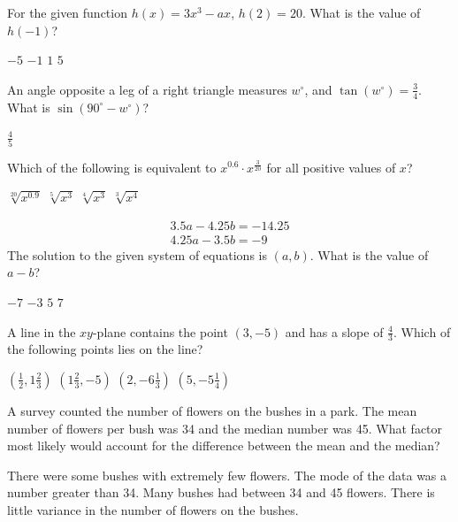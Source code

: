 \question[1]
For the given function $h(x) = 3x^3 - a x$, $h(2) = 20$. What is the value of $h(-1)$?
\begin{choices}
  \choice $-5$
  \CorrectChoice $-1$
  \choice $1$
  \choice $5$
\end{choices}



\newpage



\question[1]
An angle opposite a leg of a right triangle measures $w^\circ$, and $\tan(w^\circ) = \frac{3}{4}$. What is $\sin(90^\circ - w^\circ)$?
\begin{solution}
$\frac{4}{5}$
\end{solution}

\question[1]
Which of the following is equivalent to $x^{0.6} \cdot x^{\frac{3}{20}}$ for all positive values of $x$?
\begin{choices}
  \choice $\sqrt[20]{x^{0.9}}$
  \choice $\sqrt[5]{x^3}$
  \CorrectChoice $\sqrt[4]{x^3}$
  \choice $\sqrt[3]{x^4}$
\end{choices}

\question[1]
\[
  \begin{gathered}
    3.5a - 4.25b = -14.25 \\
    4.25a - 3.5b = -9
  \end{gathered}
\]
The solution to the given system of equations is $(a, b)$. What is the value of $a-b$?
\begin{choices}
  \choice $-7$
  \CorrectChoice $-3$
  \choice $5$
  \choice $7$
\end{choices}


\question[1]
A line in the $xy$-plane contains the point $(3, -5)$ and has a slope of $\frac{4}{3}$. Which of the following points lies on the line?
\begin{choices}
  \choice $\left(\frac{1}{2}, 1 \frac{2}{3}\right)$
  \choice $\left(1 \frac{2}{3}, -5\right)$
  \CorrectChoice $\left(2, -6 \frac{1}{3}\right)$
  \choice $\left(5, -5 \frac{1}{4}\right)$
\end{choices}





\newpage



\question[1]
A survey counted the number of flowers on the bushes in a park. The mean number of flowers per bush was 34 and the median number was 45. What factor most likely would account for the difference between the mean and the median?
\begin{choices}
  \CorrectChoice There were some bushes with extremely few flowers.
  \choice The mode of the data was a number greater than 34.
  \choice Many bushes had between 34 and 45 flowers.
  \choice There is little variance in the number of flowers on the bushes.
\end{choices}

